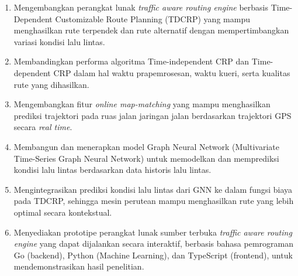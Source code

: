 \begin{enumerate}
    \item Mengembangkan  perangkat lunak \textit{traffic aware routing engine} berbasis Time-Dependent Customizable Route Planning (TDCRP) yang mampu menghasilkan rute terpendek dan rute alternatif dengan mempertimbangkan variasi kondisi lalu lintas.
    \item Membandingkan performa algoritma Time-independent CRP dan Time-dependent CRP dalam hal waktu prapemrosesan, waktu kueri, serta kualitas rute yang dihasilkan.
    \item Mengembangkan fitur \textit{online map-matching} yang mampu menghasilkan      prediksi trajektori pada ruas jalan jaringan jalan berdasarkan trajektori GPS secara \textit{real time}.
    \item  Membangun dan menerapkan model Graph Neural Network (Multivariate Time-Series Graph Neural Network) untuk memodelkan dan memprediksi kondisi lalu lintas berdasarkan data historis lalu lintas.
    \item Mengintegrasikan prediksi kondisi lalu lintas dari GNN ke dalam fungsi biaya pada TDCRP, sehingga mesin perutean mampu menghasilkan rute yang lebih optimal secara kontekstual.  
    
    \item Menyediakan prototipe perangkat lunak sumber terbuka \textit{traffic aware routing engine} yang dapat dijalankan secara interaktif, berbasis bahasa pemrograman Go (backend), Python (Machine Learning), dan TypeScript (frontend), untuk mendemonstrasikan hasil penelitian.
\end{enumerate}